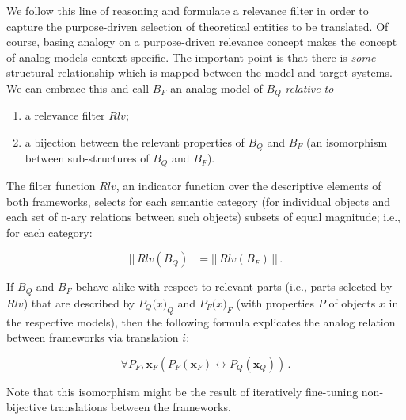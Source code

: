 \documentclass[11pt, oneside]{article}   	%
\begin{document}
\nocite{vanFraassen1980}
\nocite{Suppes2002}
\nocite{DaCostaetal2003}
\nocite{Mundy1986}
\nocite{Swoyer1991}
\nocite{Giere1988}
\nocite{Giere2004}
\nocite{Teller2001}


We follow this line of reasoning and formulate a relevance filter in order to capture the purpose-driven selection of theoretical entities to be translated. Of course, basing analogy on a purpose-driven relevance concept makes the concept of analog models context-specific.  The important point is that there is \emph{some} structural relationship which is mapped between the model and target systems.  We can embrace this and call $B_F$ an analog model of $B_Q$ \emph{relative to}

\begin{enumerate}
\item a relevance filter $Rlv$;
\item a bijection between the relevant properties of $B_Q$ and $B_F$ (an isomorphism between sub-structures of $B_Q$ and $B_F$).
\end{enumerate} 

The filter function $Rlv$, an indicator function over the descriptive elements of both frameworks, selects for each semantic category (for individual objects and each set of n-ary relations between such objects) subsets of equal magnitude; i.e., for each category:

\begin{equation}
||\,Rlv(B_Q)\,|| = ||\,Rlv(B_F)\,||\,.
\end{equation}


If $B_Q$ and $B_F$ behave alike with respect to relevant parts (i.e., parts selected by $Rlv$) that are described by $P_Q \mathbf(x)_Q$ and $P_F \mathbf(x)_F$ (with properties $P$ of objects $x$ in the respective models), then the following formula explicates the analog relation between frameworks via translation $i$:

\begin{equation}
\forall P_F, \mathbf{x}_F (P_F(\mathbf{x}_F) \leftrightarrow P_Q(\mathbf{x}_Q) )\,.
\end{equation}

Note that this isomorphism might be the result of iteratively fine-tuning non-bijective translations between the frameworks.%
\end{document}
